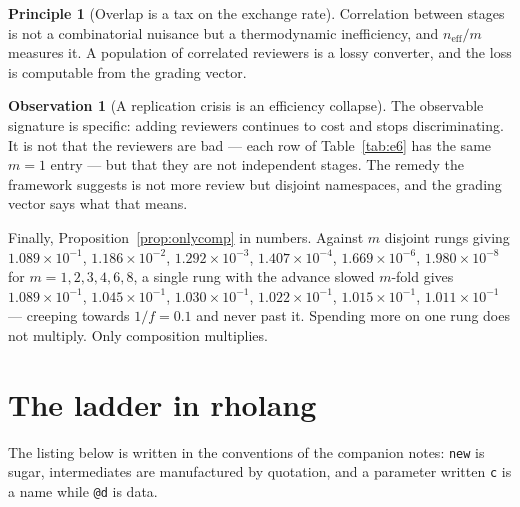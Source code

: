 \documentclass[11pt]{article}
\theoremstyle{plain}
\theoremstyle{definition}
\newtheorem{observation}[theorem]{Observation}
\newtheorem{principle}[theorem]{Principle}
\theoremstyle{remark}
\begin{document}
\begin{principle}[Overlap is a tax on the exchange rate]
Correlation between stages is not a combinatorial nuisance but a
thermodynamic inefficiency, and $n_{\mathrm{eff}}/m$ measures it. A population
of correlated reviewers is a lossy converter, and the loss is computable from
the grading vector.
\end{principle}

\begin{observation}[A replication crisis is an efficiency collapse]
The observable signature is specific: adding reviewers continues to cost and
stops discriminating. It is not that the reviewers are bad --- each row of
Table~\ref{tab:e6} has the same $m=1$ entry --- but that they are not
independent stages. The remedy the framework suggests is not more review but
disjoint namespaces, and the grading vector says what that means.
\end{observation}

Finally, Proposition~\ref{prop:onlycomp} in numbers. Against $m$ disjoint rungs
giving $1.089\times10^{-1}$, $1.186\times10^{-2}$, $1.292\times10^{-3}$,
$1.407\times10^{-4}$, $1.669\times10^{-6}$, $1.980\times10^{-8}$ for
$m = 1,2,3,4,6,8$, a single rung with the advance slowed $m$-fold gives
$1.089\times10^{-1}$, $1.045\times10^{-1}$, $1.030\times10^{-1}$,
$1.022\times10^{-1}$, $1.015\times10^{-1}$, $1.011\times10^{-1}$ --- creeping
towards $1/f = 0.1$ and never past it. Spending more on one rung does not
multiply. Only composition multiplies.

\section{The ladder in rholang}
\label{sec:code}

The listing below is written in the conventions of the companion notes:
\texttt{new} is sugar, intermediates are manufactured by quotation, and a
parameter written \texttt{c} is a name while \texttt{@d} is data.
\end{document}
